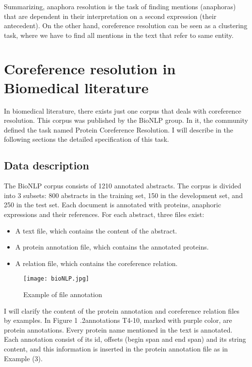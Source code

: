 Summarizing, anaphora resolution is the task of finding mentions (anaphoras) that are dependent in their interpretation on a second expression (their antecedent). On the other hand, coreference resolution can be seen as a clustering task, where we have to find all mentions in the text that refer to same entity.

\section{Coreference resolution in Biomedical literature}

In biomedical literature, there exists just one corpus that deals with coreference resolution. This corpus was published by the BioNLP group. In it, the community defined the task named Protein Coreference Resolution. I will describe in the following sections the detailed specification of this task.

\subsection{Data description}

The BioNLP corpus consists of 1210 annotated abstracts. The corpus is divided into 3 subsets: 800 abstracts in the training set, 150 in the development set, and 250 in the test set. Each document is annotated with proteins, anaphoric expressions and their references. For each abstract, three files exist:
\begin{itemize}
  \item A text file, which contains the content of the abstract.
  \item A protein annotation file, which contains the annotated proteins.
  \item A relation file, which contains the coreference relation.
\end{itemize}

\newpage
\begin{figure}[ht]
   \begin{center}
	  \texttt{[image: bioNLP.jpg]} 
      \caption[Example of file annotation]{Example of file annotation\footnotemark}
	  \label{Figure 2}
   \end{center}
\end{figure}

I will clarify the content of the protein annotation and coreference relation files by examples. In Figure 1 .2annotations T4-10, marked with purple color, are protein annotations. Every protein name mentioned in the text is annotated. Each annotation consist of its id, offsets (begin span and end span) and its string content, and this information is inserted in the protein annotation file as in Example (3).\\

